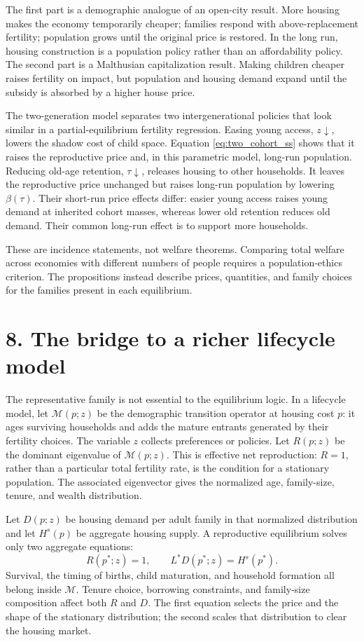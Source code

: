 \documentclass[11pt]{article}
\theoremstyle{definition}
\begin{document}
The first part is a demographic analogue of an open-city result. More housing
makes the economy temporarily cheaper; families respond with above-replacement
fertility; population grows until the original price is restored. In the long
run, housing construction is a population policy rather than an affordability
policy. The second part is a Malthusian capitalization result. Making children
cheaper raises fertility on impact, but population and housing demand expand
until the subsidy is absorbed by a higher house price.

The two-generation model separates two intergenerational policies that look
similar in a partial-equilibrium fertility regression. Easing young access,
$z\downarrow$, lowers the shadow cost of child space. Equation
\eqref{eq:two_cohort_ss} shows that it raises the reproductive price and, in
this parametric model, long-run population. Reducing old-age retention,
$\tau\downarrow$, releases housing to other households. It leaves the
reproductive price unchanged but raises long-run population by lowering
$\beta(\tau)$. Their short-run price effects differ: easier young access raises
young demand at inherited cohort masses, whereas lower old retention reduces
old demand. Their common long-run effect is to support more households.

These are incidence statements, not welfare theorems. Comparing total welfare
across economies with different numbers of people requires a population-ethics
criterion. The propositions instead describe prices, quantities, and family
choices for the families present in each equilibrium.

\section*{8. The bridge to a richer lifecycle model}

The representative family is not essential to the equilibrium logic. In a
lifecycle model, let $\mathcal M(p;z)$ be the demographic transition operator
at housing cost $p$: it ages surviving households and adds the mature entrants
generated by their fertility choices. The variable $z$ collects preferences
or policies. Let $R(p;z)$ be the dominant eigenvalue of $\mathcal M(p;z)$.
This is effective net reproduction: $R=1$, rather than a particular total
fertility rate, is the condition for a stationary population. The associated
eigenvector gives the normalized age, family-size, tenure, and wealth
distribution.

Let $D(p;z)$ be housing demand per adult family in that normalized distribution
and let $H^s(p)$ be aggregate housing supply. A reproductive equilibrium solves
only two aggregate equations:
\begin{equation}
 R(p^*;z)=1,
 \qquad
 L^*D(p^*;z)=H^s(p^*).
 \label{eq:general_closure}
\end{equation}
Survival, the timing of births, child maturation, and household formation all
belong inside $\mathcal M$. Tenure choice, borrowing constraints, and
family-size composition affect both $R$ and $D$. The first equation selects the
price and the shape of the stationary distribution; the second scales that
distribution to clear the housing market.
\end{document}

